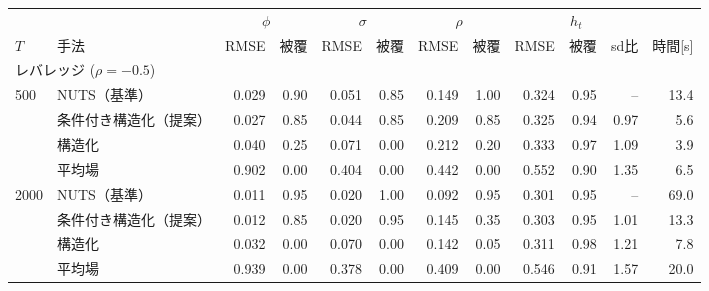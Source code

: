 \begin{tabular}{llrrrrrrrrrr}
\toprule
 & & \multicolumn{2}{c}{$\phi$} & \multicolumn{2}{c}{$\sigma$} & \multicolumn{2}{c}{$\rho$} & \multicolumn{3}{c}{$h_t$} & \\
$T$ & 手法 & RMSE & 被覆 & RMSE & 被覆 & RMSE & 被覆 & RMSE & 被覆 & sd比 & 時間[s] \\
\midrule
\multicolumn{12}{l}{レバレッジ ($\rho=-0.5$)} \\
500 & NUTS（基準） & 0.029 & 0.90 & 0.051 & 0.85 & 0.149 & 1.00 & 0.324 & 0.95 & -- & 13.4 \\
 & 条件付き構造化（提案） & 0.027 & 0.85 & 0.044 & 0.85 & 0.209 & 0.85 & 0.325 & 0.94 & 0.97 & 5.6 \\
 & 構造化 & 0.040 & 0.25 & 0.071 & 0.00 & 0.212 & 0.20 & 0.333 & 0.97 & 1.09 & 3.9 \\
 & 平均場 & 0.902 & 0.00 & 0.404 & 0.00 & 0.442 & 0.00 & 0.552 & 0.90 & 1.35 & 6.5 \\
2000 & NUTS（基準） & 0.011 & 0.95 & 0.020 & 1.00 & 0.092 & 0.95 & 0.301 & 0.95 & -- & 69.0 \\
 & 条件付き構造化（提案） & 0.012 & 0.85 & 0.020 & 0.95 & 0.145 & 0.35 & 0.303 & 0.95 & 1.01 & 13.3 \\
 & 構造化 & 0.032 & 0.00 & 0.070 & 0.00 & 0.142 & 0.05 & 0.311 & 0.98 & 1.21 & 7.8 \\
 & 平均場 & 0.939 & 0.00 & 0.378 & 0.00 & 0.409 & 0.00 & 0.546 & 0.91 & 1.57 & 20.0 \\
\bottomrule
\end{tabular}
